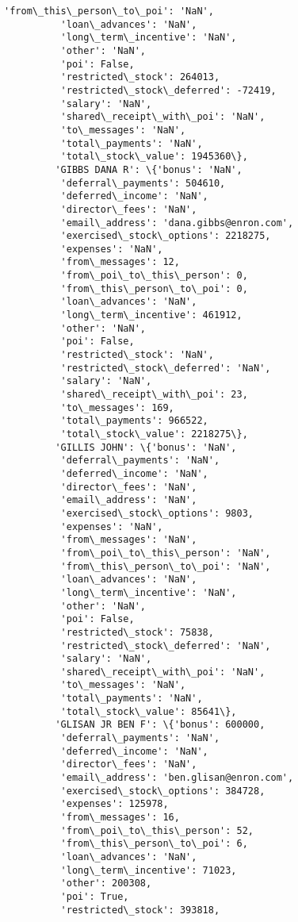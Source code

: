 \documentclass[11pt]{article}
\begin{document}
\begin{Verbatim}[commandchars=\\\{\}]
          'from\_this\_person\_to\_poi': 'NaN',
          'loan\_advances': 'NaN',
          'long\_term\_incentive': 'NaN',
          'other': 'NaN',
          'poi': False,
          'restricted\_stock': 264013,
          'restricted\_stock\_deferred': -72419,
          'salary': 'NaN',
          'shared\_receipt\_with\_poi': 'NaN',
          'to\_messages': 'NaN',
          'total\_payments': 'NaN',
          'total\_stock\_value': 1945360\},
         'GIBBS DANA R': \{'bonus': 'NaN',
          'deferral\_payments': 504610,
          'deferred\_income': 'NaN',
          'director\_fees': 'NaN',
          'email\_address': 'dana.gibbs@enron.com',
          'exercised\_stock\_options': 2218275,
          'expenses': 'NaN',
          'from\_messages': 12,
          'from\_poi\_to\_this\_person': 0,
          'from\_this\_person\_to\_poi': 0,
          'loan\_advances': 'NaN',
          'long\_term\_incentive': 461912,
          'other': 'NaN',
          'poi': False,
          'restricted\_stock': 'NaN',
          'restricted\_stock\_deferred': 'NaN',
          'salary': 'NaN',
          'shared\_receipt\_with\_poi': 23,
          'to\_messages': 169,
          'total\_payments': 966522,
          'total\_stock\_value': 2218275\},
         'GILLIS JOHN': \{'bonus': 'NaN',
          'deferral\_payments': 'NaN',
          'deferred\_income': 'NaN',
          'director\_fees': 'NaN',
          'email\_address': 'NaN',
          'exercised\_stock\_options': 9803,
          'expenses': 'NaN',
          'from\_messages': 'NaN',
          'from\_poi\_to\_this\_person': 'NaN',
          'from\_this\_person\_to\_poi': 'NaN',
          'loan\_advances': 'NaN',
          'long\_term\_incentive': 'NaN',
          'other': 'NaN',
          'poi': False,
          'restricted\_stock': 75838,
          'restricted\_stock\_deferred': 'NaN',
          'salary': 'NaN',
          'shared\_receipt\_with\_poi': 'NaN',
          'to\_messages': 'NaN',
          'total\_payments': 'NaN',
          'total\_stock\_value': 85641\},
         'GLISAN JR BEN F': \{'bonus': 600000,
          'deferral\_payments': 'NaN',
          'deferred\_income': 'NaN',
          'director\_fees': 'NaN',
          'email\_address': 'ben.glisan@enron.com',
          'exercised\_stock\_options': 384728,
          'expenses': 125978,
          'from\_messages': 16,
          'from\_poi\_to\_this\_person': 52,
          'from\_this\_person\_to\_poi': 6,
          'loan\_advances': 'NaN',
          'long\_term\_incentive': 71023,
          'other': 200308,
          'poi': True,
          'restricted\_stock': 393818,

\end{Verbatim}
\end{document}
